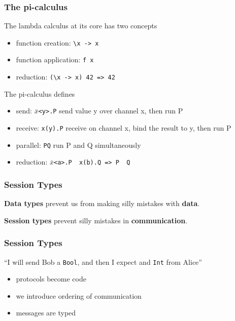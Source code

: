 \documentclass[12pt]{beamer}
\providecommand{\tightlist}{%
  \setlength{\itemsep}{0pt}\setlength{\parskip}{0pt}}
\begin{document}

\begin{frame}
\frametitle{The pi-calculus}

The lambda calculus at its core has two concepts

\begin{itemize}
\tightlist
\item
function creation: \texttt{\textbackslash{}x\ -\textgreater{}\ x}
\item
function application: \texttt{f x}
\item
reduction: \texttt{(\textbackslash{}x\ -\textgreater{}\ x)\ 42\ =\textgreater{}\ 42} \\
\end{itemize}

The pi-calculus defines

\begin{itemize}
\tightlist
\item
  send: \texttt{$\bar{x}$\textless{}y\textgreater{}.P} send value y over channel
  x, then run P
\item
  receive: \texttt{x(y).P} receive on channel x, bind the result to y,
  then run P
\item
  parallel: \texttt{P\textbar{}Q} run P and Q simultaneously
\item reduction: \texttt{$\bar{x}$\textless{}a\textgreater{}.P\ \textbar{}\ x(b).Q\ =\textgreater{}\ P\ \textbar{}\ Q}
\end{itemize}

\end{frame}

\begin{frame}
\frametitle{Session Types}

\begin{center}
    \textbf{Data types} prevent us from making silly mistakes with \textbf{data}. \linebreak 

    \textbf{Session types} prevent silly mistakes in \textbf{communication}.  
\end{center}

\end{frame}

\begin{frame}
\frametitle{Session Types}


“I will send Bob a \texttt{Bool}, and then I expect and \texttt{Int} from Alice”

\begin{itemize}
    \item protocols become code
    \item we introduce ordering of communication
    \item messages are typed
\end{itemize}


\end{frame}
\end{document}

